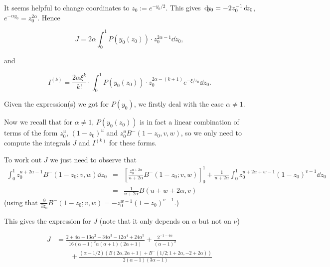 \noindent
It seems helpful to change coordinates to $z_0 := e^{-y_0/2}$.
This gives ${\operatorname{\, \mathrm{d}\hspace{-2pt}}} y_0 = {{\color{black} -}}2 z_0^{-1} {\operatorname{\, \mathrm{d}\hspace{-2pt}}} z_0$, $e^{-\alpha y_0} = z_0^{2\alpha}$.
Hence 

\[ J = 2 \alpha \int_0^1 P(y_0(z_0)) \cdot z_0^{2\alpha-1} {\dd} z_0, \]

\noindent
and 

\[ I^{(k)} = \frac{2 \alpha \xi^k}{k!} \cdot \int_0^1 P(y_0(z_0)) \cdot z_0^{2\alpha-(k+1)} e^{-\xi/z_0} {\dd} z_0. \]

\noindent
Given the expression(s) we got for $P(y_0)$, we firstly deal with the case $\alpha \not = 1$. %


\noindent
Now we recall that for $\alpha \not =1$, $P(y_0(z_0))$ is in fact a linear combination of terms of the form $z_0^u$, $(1-z_0)^u$ and $z_0^u B^-(1-z_0,v,w)$, so we only need to compute the integrals $J$ and $I^{(k)}$ for these forms.

\vspace{1em}

\noindent
To work out $J$ we just need to observe that 
\[ \begin{array}{rcl} 
\int_0^1 z_0^{u+2\alpha-1} B^-(1-z_0;v,w) {\dd} z_0 
& = & 
\left[ \frac{z_0^{u+2\alpha}}{u+2\alpha} B^-(1-z_0;v,w) \right]_0^1 
+ \frac{1}{u+2\alpha} \int_0^1 z_0^{u+2\alpha+w-1} (1-z_0)^{v-1} {\dd} z_0 \\
& = & 
\frac{1}{u+2\alpha} B(u+w+2\alpha,v)
\end{array} \]
\noindent
(using that $\frac{\partial}{\partial z_0} B^-(1-z_0;v,w) = - z_0^{w-1} (1-z_0)^{v-1}$.)

This gives the expression for $J$ (note that it only depends on $\alpha$ but not on $\nu$)

\begin{align*}
J&=\frac{2 + 4 \alpha + 13 \alpha^2 - 34 \alpha^3 - 12\alpha^4 + 
	24 \alpha^5}{16(\alpha-1)^2 \alpha (\alpha+1) (2\alpha+1)} +  \frac{2^{-1 - 
		4 \alpha}}{(\alpha - 1)^2} \\
	&\qquad+ \frac{(\alpha - 1/2) (B(2 \alpha, 2 \alpha + 1) + 
	B^-(1/2; 1 + 2 \alpha, -2 + 2 \alpha))}{2 (\alpha - 1) (3 \alpha - 1)}
\end{align*}


